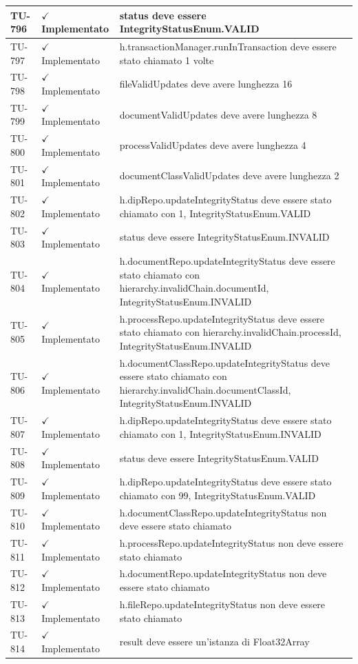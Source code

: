 ﻿\documentclass[a4paper,12pt]{article}
\newcommand{\ok}{\textcolor{green!60!black}{$\checkmark$ Implementato}}
\begin{document}
\begin{longtable}{|p{2cm}|p{3.5cm}|p{9.5cm}|}
\hline
TU-796 & \ok & status deve essere IntegrityStatusEnum.VALID \\
\hline
TU-797 & \ok & h.transactionManager.runInTransaction deve essere stato chiamato 1 volte \\
\hline
TU-798 & \ok & fileValidUpdates deve avere lunghezza 16 \\
\hline
TU-799 & \ok & documentValidUpdates deve avere lunghezza 8 \\
\hline
TU-800 & \ok & processValidUpdates deve avere lunghezza 4 \\
\hline
TU-801 & \ok & documentClassValidUpdates deve avere lunghezza 2 \\
\hline
TU-802 & \ok & h.dipRepo.updateIntegrityStatus deve essere stato chiamato con 1, IntegrityStatusEnum.VALID \\
\hline
TU-803 & \ok & status deve essere IntegrityStatusEnum.INVALID \\
\hline
TU-804 & \ok & h.documentRepo.updateIntegrityStatus deve essere stato chiamato con hierarchy.invalidChain.documentId, IntegrityStatusEnum.INVALID \\
\hline
TU-805 & \ok & h.processRepo.updateIntegrityStatus deve essere stato chiamato con hierarchy.invalidChain.processId, IntegrityStatusEnum.INVALID \\
\hline
TU-806 & \ok & h.documentClassRepo.updateIntegrityStatus deve essere stato chiamato con hierarchy.invalidChain.documentClassId, IntegrityStatusEnum.INVALID \\
\hline
TU-807 & \ok & h.dipRepo.updateIntegrityStatus deve essere stato chiamato con 1, IntegrityStatusEnum.INVALID \\
\hline
TU-808 & \ok & status deve essere IntegrityStatusEnum.VALID \\
\hline
TU-809 & \ok & h.dipRepo.updateIntegrityStatus deve essere stato chiamato con 99, IntegrityStatusEnum.VALID \\
\hline
TU-810 & \ok & h.documentClassRepo.updateIntegrityStatus non deve essere stato chiamato \\
\hline
TU-811 & \ok & h.processRepo.updateIntegrityStatus non deve essere stato chiamato \\
\hline
TU-812 & \ok & h.documentRepo.updateIntegrityStatus non deve essere stato chiamato \\
\hline
TU-813 & \ok & h.fileRepo.updateIntegrityStatus non deve essere stato chiamato \\
\hline
TU-814 & \ok & result deve essere un'istanza di Float32Array \\

\end{longtable}
\end{document}
